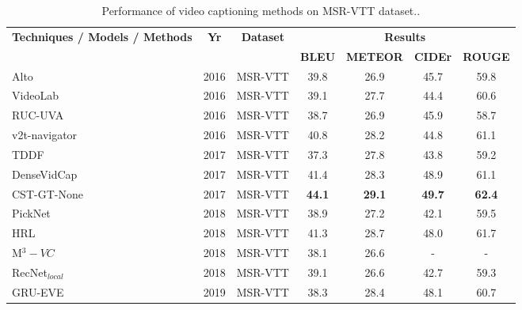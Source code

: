 \documentclass[10pt,journal,compsoc]{IEEEtran}
\begin{document}
\begin{table*}[bhtp]
  \centering
  \small
  \setlength{\tabcolsep}{10.0pt}       %
\caption{Performance of video captioning methods on MSR-VTT dataset..}
\vspace{-2mm}
     \begin{tabular}{|p{15.43em}|c|c|c|c|c|c|}
    \hline
    \multirow{2}[1]{*}{\textbf{Techniques / Models / Methods}} & \multirow{2}[1]{*}{\textbf{Yr}} & \multirow{2}[1]{*}{\textbf{Dataset}} & \multicolumn{4}{c|}{\textbf{Results}} \\
\cline{4-7}    \multicolumn{1}{|l|}{} & & & \textbf{BLEU} & \textbf{METEOR} & \textbf{CIDEr} & \textbf{ROUGE} \\
    \hline
    \multicolumn{1}{|l|}{Alto \cite{shetty2016frame}} & 2016  & MSR-VTT  & 39.8  & 26.9 & 45.7 & 59.8 \\
    \hline
     \multicolumn{1}{|l|}{VideoLab \cite{ramanishka2016multimodal}} & 2016  & MSR-VTT  & 39.1  & 27.7 & 44.4 & 60.6 \\
    \hline
    \multicolumn{1}{|l|}{RUC-UVA \cite{dong2016early}} & 2016  & MSR-VTT  & 38.7 & 26.9 & 45.9 & 58.7 \\
    \hline
    \multicolumn{1}{|l|}{v2t-navigator \cite{jin2016describing}} & 2016  & MSR-VTT  & 40.8  & 28.2 & 44.8 & 61.1 \\
    \hline
    \multicolumn{1}{|l|}{TDDF \cite{Zhang_2017_CVPR}} & 2017  & MSR-VTT  & 37.3  & 27.8 & 43.8 & 59.2 \\
    \hline
    \multicolumn{1}{|l|}{DenseVidCap \cite{Shen_2017_CVPR}} & 2017  & MSR-VTT  & 41.4 & 28.3 & 48.9 & 61.1 \\
    \hline
     \multicolumn{1}{|l|}{CST-GT-None \cite{phan2017consensus}} & 2017  & MSR-VTT  & \textbf{44.1} & \textbf{29.1} & \textbf{49.7} & \textbf{62.4} \\
    \hline
    \multicolumn{1}{|l|}{PickNet \cite{chen2018less}} & 2018  & MSR-VTT & 38.9 & 27.2 & 42.1 & 59.5 \\
    \hline
    HRL \cite{wang2017video} & 2018  & MSR-VTT & 41.3  & 28.7  & 48.0  & 61.7 \\
    \hline
    \multicolumn{1}{|l|}{M$^3-{VC}$~\cite{wang2018m3}} & 2018  & MSR-VTT  & 38.1 & 26.6 & -  & - \\
    \hline
    RecNet$_{local}$~\cite{wang2018reconstruction} & 2018  & MSR-VTT & 39.1 & 26.6 & 42.7 & 59.3 \\
    \hline
    GRU-EVE~\cite{gruevehftsem} & 2019 & MSR-VTT & 38.3 & 28.4 & 48.1 & 60.7 \\
    \hline
    \end{tabular}%
  \label{tab:msrvttresults}%
 \end{table*}%
\end{document}
